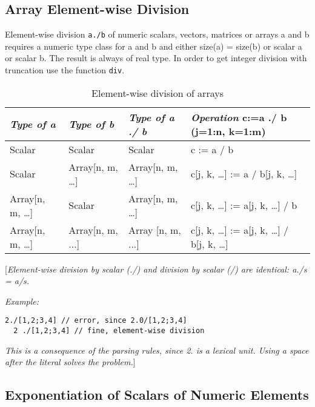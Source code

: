 \subsection{Array Element-wise Division}

Element-wise division \lstinline!a./b! of numeric scalars, vectors, matrices or
arrays a and b requires a numeric type class for a and b and either
size(a) = size(b) or scalar a or scalar b. The result is always of real
type. In order to get integer division with truncation use the function
\lstinline!div!.

\begin{longtable}[]{|l|l|l|l|}
\caption{Element-wise division of arrays}\\
\hline \endhead
\emph{Type of a} & \emph{Type of b} & \emph{Type of a ./ b} &
\emph{Operation} c:=a ./ b (j=1:n, k=1:m)\\ \hline
Scalar & Scalar & Scalar & c := a / b\\ \hline
Scalar & Array{[}n, m, \ldots{}{]} & Array{[}n, m, \ldots{}{]} & c{[}j,
k, \ldots{}{]} := a / b{[}j, k, \ldots{}{]}\\ \hline
Array{[}n, m, \ldots{}{]} & Scalar & Array{[}n, m, \ldots{}{]} & c{[}j,
k, \ldots{}{]} := a{[}j, k, \ldots{}{]} / b\\ \hline
Array{[}n, m, \ldots{}{]} & Array{[}n, m, ...{]} & Array {[}n, m, ...{]}
& c{[}j, k, \ldots{}{]} := a{[}j, k, \ldots{}{]} / b{[}j, k,
\ldots{}{]}\\ \hline

\end{longtable}

{[}\emph{Element-wise division by scalar (./) and division by scalar (/)
are identical: a./s = a/s.}

\emph{Example:}

\begin{lstlisting}[language=modelica]
  2./[1,2;3,4] // error, since 2.0/[1,2;3,4]
  2 ./[1,2;3,4] // fine, element-wise division
\end{lstlisting}
\emph{This is a consequence of the parsing rules, since 2. is a lexical
unit. Using a space after the literal solves the problem.}{]}

\subsection{Exponentiation of Scalars of Numeric Elements}

